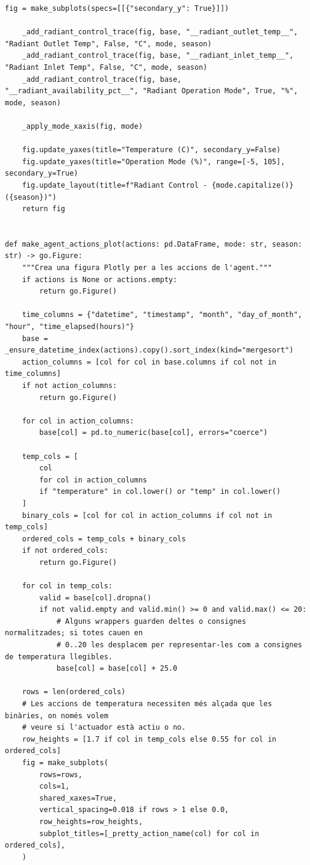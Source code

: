\documentclass[10pt,a4paper]{article}
\begin{document}
\begin{lstlisting}[style=studioPython,caption={backend/grafics/control.py},label={lst:backend-grafics-control-py}]
    fig = make_subplots(specs=[[{"secondary_y": True}]])

    _add_radiant_control_trace(fig, base, "__radiant_outlet_temp__", "Radiant Outlet Temp", False, "C", mode, season)
    _add_radiant_control_trace(fig, base, "__radiant_inlet_temp__", "Radiant Inlet Temp", False, "C", mode, season)
    _add_radiant_control_trace(fig, base, "__radiant_availability_pct__", "Radiant Operation Mode", True, "%", mode, season)

    _apply_mode_xaxis(fig, mode)

    fig.update_yaxes(title="Temperature (C)", secondary_y=False)
    fig.update_yaxes(title="Operation Mode (%)", range=[-5, 105], secondary_y=True)
    fig.update_layout(title=f"Radiant Control - {mode.capitalize()} ({season})")
    return fig


def make_agent_actions_plot(actions: pd.DataFrame, mode: str, season: str) -> go.Figure:
    """Crea una figura Plotly per a les accions de l'agent."""
    if actions is None or actions.empty:
        return go.Figure()

    time_columns = {"datetime", "timestamp", "month", "day_of_month", "hour", "time_elapsed(hours)"}
    base = _ensure_datetime_index(actions).copy().sort_index(kind="mergesort")
    action_columns = [col for col in base.columns if col not in time_columns]
    if not action_columns:
        return go.Figure()

    for col in action_columns:
        base[col] = pd.to_numeric(base[col], errors="coerce")

    temp_cols = [
        col
        for col in action_columns
        if "temperature" in col.lower() or "temp" in col.lower()
    ]
    binary_cols = [col for col in action_columns if col not in temp_cols]
    ordered_cols = temp_cols + binary_cols
    if not ordered_cols:
        return go.Figure()

    for col in temp_cols:
        valid = base[col].dropna()
        if not valid.empty and valid.min() >= 0 and valid.max() <= 20:
            # Alguns wrappers guarden deltes o consignes normalitzades; si totes cauen en
            # 0..20 les desplacem per representar-les com a consignes de temperatura llegibles.
            base[col] = base[col] + 25.0

    rows = len(ordered_cols)
    # Les accions de temperatura necessiten més alçada que les binàries, on només volem
    # veure si l'actuador està actiu o no.
    row_heights = [1.7 if col in temp_cols else 0.55 for col in ordered_cols]
    fig = make_subplots(
        rows=rows,
        cols=1,
        shared_xaxes=True,
        vertical_spacing=0.018 if rows > 1 else 0.0,
        row_heights=row_heights,
        subplot_titles=[_pretty_action_name(col) for col in ordered_cols],
    )


\end{lstlisting}
\end{document}
